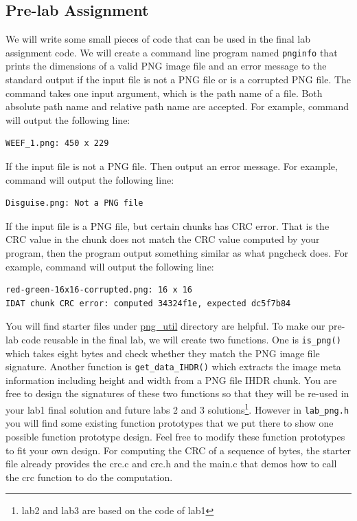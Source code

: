 \subsection{Pre-lab Assignment}
\label{sec:lab1_prelab_assignment}
We will write some small pieces of code that can be used in the final lab assignment code. We will create a command line program named \verb+pnginfo+ that prints the dimensions of a valid PNG image file and an error message to the standard output if the input file is not a PNG file or is a corrupted PNG file. The command takes one input argument, which is the path name of a file. Both absolute path name and relative path name are accepted. For example, command  will output the following line: 
\begin{verbatim}
WEEF_1.png: 450 x 229 
\end{verbatim}
If the input file is not a PNG file. Then output an error message. For example, command  will output the following line:
\begin{verbatim}
Disguise.png: Not a PNG file 
\end{verbatim}
If the input file is a PNG file, but certain chunks has CRC error. That is the CRC value in the chunk does not match the CRC value computed by your program, then the program output something similar as what pngcheck does. For example, command  will output the following line:
\begin{verbatim}
red-green-16x16-corrupted.png: 16 x 16 
IDAT chunk CRC error: computed 34324f1e, expected dc5f7b84
\end{verbatim}

You will find starter files under \href{http://github.com/yqh/ece252/tree/master/lab1/starter/png_util}{png\_util} directory are helpful. To make our pre-lab code reusable in the final lab, we will create two functions. One is \verb+is_png()+ which takes eight bytes and check whether they match the PNG image file signature. Another function is \verb+get_data_IHDR()+ which extracts the image meta information including height and width from a PNG file IHDR chunk. You are free to design the signatures of these two functions so that they will be re-used in your lab1 final solution and future labs 2 and 3 solutions\footnote{lab2 and lab3 are based on the code of lab1}. However in \verb+lab_png.h+ you will find some existing function prototypes that we put there to show one possible function prototype design. Feel free to modify these function prototypes to fit your own design. For computing the CRC of a sequence of bytes, the starter file already provides the crc.c and crc.h and the main.c that demos how to call the crc function to do the computation.
